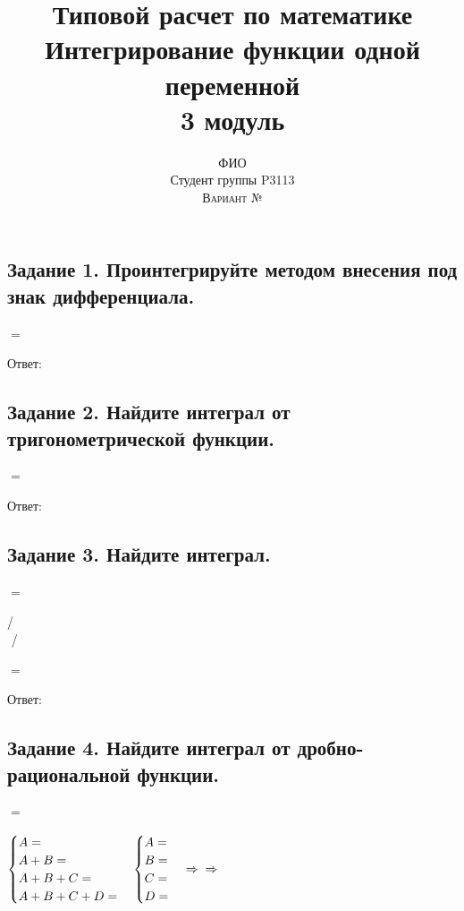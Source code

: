 \documentclass[12pt]{article}
\title{Типовой расчет по математике\\Интегрирование функции одной переменной\\3 модуль}
\author{ФИО\\
Студент группы P3113\\
\textsc{Вариант №}}
\begin{document}
\setlength{\droptitle}{-5em}    

\maketitle

\subsection*{Задание 1. Проинтегрируйте методом внесения под знак дифференциала.}

$=$\vspace{2.5mm}

Ответ: $ $

\subsection*{Задание 2. Найдите интеграл от тригонометрической функции.}

$=$\vspace{2.5mm}

Ответ: $ $

\subsection*{Задание 3. Найдите интеграл.}

$=$\vspace{2.5mm}

/ $ $ \\
$ $ /

$=$\vspace{2.5mm}

Ответ: $ $

\subsection*{Задание 4. Найдите интеграл от дробно-рациональной функции.}

$=$\vspace{2.5mm}

$
\begin{cases}
A=\\
A+B=\\
A+B+C=\\
A+B+C+D=
\end{cases} \begin{cases}
A=\\
B=\\
C=\\
D=
\end{cases}\Rightarrow\vspace{2.5mm} \\
\Rightarrow $\vspace{2.5mm}
\end{document}
